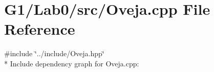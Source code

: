 \section{G1/\+Lab0/src/\+Oveja.cpp File Reference}
\label{_oveja_8cpp}
{\ttfamily \#include \char`\"{}../include/\+Oveja.\+hpp\char`\"{}}\\*
Include dependency graph for Oveja.\+cpp\+:

